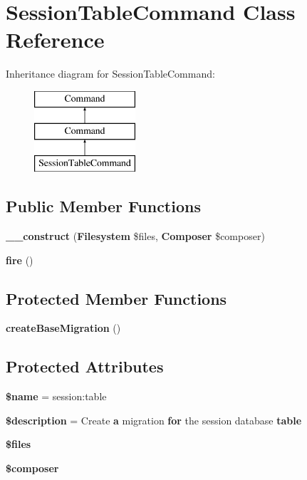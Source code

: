 \section{Session\+Table\+Command Class Reference}
\label{class_illuminate_1_1_session_1_1_console_1_1_session_table_command}
Inheritance diagram for Session\+Table\+Command\+:\begin{figure}[H]
\begin{center}
\leavevmode
\includegraphics[height=3.000000cm]{class_illuminate_1_1_session_1_1_console_1_1_session_table_command}
\end{center}
\end{figure}
\subsection*{Public Member Functions}
\begin{DoxyCompactItemize}
\item 
{\bf \+\_\+\+\_\+construct} ({\bf Filesystem} \$files, {\bf Composer} \$composer)
\item 
{\bf fire} ()
\end{DoxyCompactItemize}
\subsection*{Protected Member Functions}
\begin{DoxyCompactItemize}
\item 
{\bf create\+Base\+Migration} ()
\end{DoxyCompactItemize}
\subsection*{Protected Attributes}
\begin{DoxyCompactItemize}
\item 
{\bf \$name} = \textquotesingle{}session\+:table\textquotesingle{}
\item 
{\bf \$description} = \textquotesingle{}Create {\bf a} migration {\bf for} the session database {\bf table}\textquotesingle{}
\item 
{\bf \$files}
\item 
{\bf \$composer}
\end{DoxyCompactItemize}


